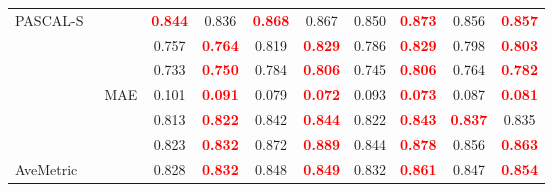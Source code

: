 \documentclass[runningheads]{llncs}
\begin{document}
\begin{table}[H]
{\begin{tabular}{l|l|cc|cc|cc|cc}
   \multirow{6}{*}{PASCAL-S~\cite{PASCAL-S}}   &                                                    & \textcolor{red}{\textbf{0.844}} & 0.836                           & \textcolor{red}{\textbf{0.868}} & 0.867                           & 0.850 & \textcolor{red}{\textbf{0.873}} & 0.856                           & \textcolor{red}{\textbf{0.857}} \\
                                               &                                                    & 0.757                           & \textcolor{red}{\textbf{0.764}} & 0.819                           & \textcolor{red}{\textbf{0.829}} & 0.786 & \textcolor{red}{\textbf{0.829}} & 0.798                           & \textcolor{red}{\textbf{0.803}} \\
                                               &                                         & 0.733                           & \textcolor{red}{\textbf{0.750}} & 0.784                           & \textcolor{red}{\textbf{0.806}} & 0.745 & \textcolor{red}{\textbf{0.806}} & 0.764                           & \textcolor{red}{\textbf{0.782}} \\
                                               & MAE                                                         & 0.101                           & \textcolor{red}{\textbf{0.091}} & 0.079                           & \textcolor{red}{\textbf{0.072}} & 0.093 & \textcolor{red}{\textbf{0.073}} & 0.087                           & \textcolor{red}{\textbf{0.081}} \\
                                               &                                                      & 0.813                           & \textcolor{red}{\textbf{0.822}} & 0.842                           & \textcolor{red}{\textbf{0.844}} & 0.822 & \textcolor{red}{\textbf{0.843}} & \textcolor{red}{\textbf{0.837}} & 0.835                           \\
                                               &                                                      & 0.823                           & \textcolor{red}{\textbf{0.832}} & 0.872                           & \textcolor{red}{\textbf{0.889}} & 0.844 & \textcolor{red}{\textbf{0.878}} & 0.856                           & \textcolor{red}{\textbf{0.863}} \\ \hline
   \multirow{6}{*}{AveMetric}                  &                                                    & 0.828                           & \textcolor{red}{\textbf{0.832}} & 0.848                           & \textcolor{red}{\textbf{0.849}} & 0.832 & \textcolor{red}{\textbf{0.861}} & 0.847                           & \textcolor{red}{\textbf{0.854}} \\

\end{tabular}}
\end{table}
\end{document}
